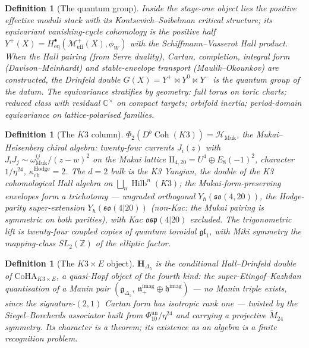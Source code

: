 \documentclass[11pt]{article}
\providecommand{\cH}{\mathcal{H}}
\providecommand{\cM}{\mathcal{M}}
\providecommand{\bC}{\mathbb{C}}
\providecommand{\bZ}{\mathbb{Z}}
\providecommand{\fg}{\mathfrak{g}}
\providecommand{\fgl}{\mathfrak{gl}}
\providecommand{\fso}{\mathfrak{so}}
\providecommand{\fosp}{\mathfrak{osp}}
\providecommand{\kch}{\kappa_{\mathrm{ch}}}
\providecommand{\CoHA}{\mathrm{CoHA}}
\providecommand{\Dfive}{\Delta_5}
\providecommand{\Phiten}{\Phi_{10}}
\providecommand{\Coh}{\operatorname{Coh}}
\providecommand{\Hilb}{\operatorname{Hilb}}
\providecommand{\Muk}{\mathrm{Muk}}
\newtheorem{definition}[theorem]{Definition}
\begin{document}
\begin{definition}[The quantum group]
Inside the stage-one object lies the positive effective moduli stack
with its Kontsevich--Soibelman critical structure; its equivariant
vanishing-cycle cohomology is the positive half
$Y^+(X)=H^\bullet_{\mathrm{eq}}(\cM^+_{\mathrm{eff}}(X),\phi_W)$ with
the Schiffmann--Vasserot Hall product. When the Hall pairing
\textup{(from Serre duality)}, Cartan, completion, integral form
\textup{(Davison--Meinhardt)} and stable-envelope transport
\textup{(Maulik--Okounkov)} are constructed, the Drinfeld double
$G(X)=Y^+\bowtie Y^0\bowtie Y^-$ is the quantum group of the datum.
The equivariance stratifies by geometry: full torus on toric charts;
reduced class with residual $\bC^\times$ on compact targets; orbifold
inertia; period-domain equivariance on lattice-polarised families.
\end{definition}

\begin{definition}[The $K3$ column]
$\Phi_2(D^b\Coh(K3))=\cH_{\Muk}$, the Mukai--Heisenberg chiral
algebra: twenty-four currents $J_i(z)$ with
$J_iJ_j\sim\omega^{ij}_{\Muk}/(z-w)^2$ on the Mukai lattice
$\mathrm{II}_{4,20}=U^{4}\oplus E_8(-1)^{2}$, character $1/\eta^{24}$,
$\kch^{\mathrm{Hodge}}=2$. The $d=2$ bulk is the K3 Yangian, the
double of the K3 cohomological Hall algebra on
$\bigsqcup_n\Hilb^n(K3)$; the Mukai-form-preserving envelopes form a
trichotomy --- ungraded orthogonal $Y_\hbar(\fso(4,20))$, the
Hodge-parity super-extension $Y_\hbar(\fso(4|20))$
\textup{(non-Kac: the Mukai pairing is symmetric on both parities)},
with Kac $\fosp(4|20)$ excluded. The trigonometric lift is twenty-four
coupled copies of quantum toroidal $\fgl_1$, with Miki symmetry the
mapping-class $SL_2(\bZ)$ of the elliptic factor.
\end{definition}

\begin{definition}[The $K3\times E$ object]
$\mathbf H_{\Dfive}$ is the conditional Hall--Drinfeld double of
$\CoHA_{K3\times E}$, a quasi-Hopf object of the fourth kind: the
super-Etingof--Kazhdan quantisation of a Manin \emph{pair}
$(\fg_{\Dfive},\ \mathfrak n^{\mathrm{imag}}_+\oplus
\mathfrak h^{\mathrm{imag}})$ --- no Manin triple exists, since the
signature-$(2,1)$ Cartan form has isotropic rank one --- twisted by
the Siegel--Borcherds associator built from
$\Phiten^{\mathrm{un}}/\eta^{24}$ and carrying a projective
$\widetilde M_{24}$ symmetry. Its character is a theorem; its
existence as an algebra is a finite recognition problem.
\end{definition}
\end{document}
